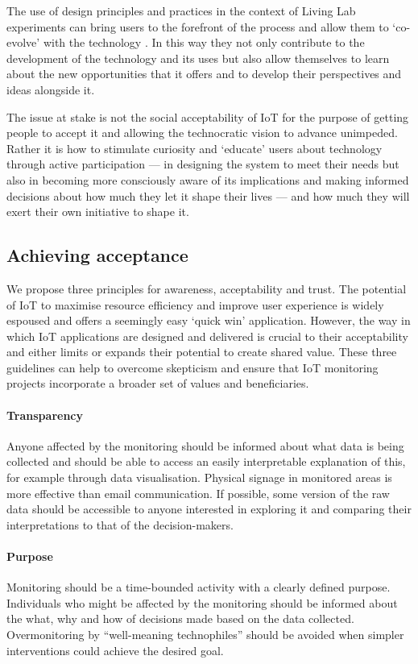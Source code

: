 The use of design principles and practices in the context of Living
Lab experiments can bring users to the forefront of the process and
allow them to ‘co-evolve’ with the technology \cite{Shin-2017-UTIO}.
In this way they not only contribute to the development of the
technology and its uses but also allow themselves to learn about the
new opportunities that it offers and to develop their perspectives and
ideas alongside it.

The issue at stake is not the social acceptability of IoT for the
purpose of getting people to accept it and allowing the technocratic
vision to advance unimpeded. Rather it is how to stimulate curiosity
and ‘educate’ users about technology through active participation ---
in designing the system to meet their needs but also in becoming more
consciously aware of its implications and making informed decisions
about how much they let it shape their lives --- and how much they
will exert their own initiative to shape it.

\subsection{Achieving acceptance}
\label{sec:achieving-acceptance}

We propose three principles for awareness, acceptability and trust. The potential of IoT to maximise
resource efficiency and improve user experience is widely espoused and
offers a seemingly easy ‘quick win’ application. However, the way in
which IoT applications are designed and delivered is crucial to their
acceptability and either limits or expands their potential to create shared value. These
three guidelines can help to overcome skepticism and ensure that IoT
monitoring projects incorporate a broader set of values and
beneficiaries. 


\paragraph{Transparency} Anyone affected by the monitoring should be
informed about what data is being collected and should be able to
access an easily interpretable explanation of this, for example
through data visualisation. Physical signage in monitored areas is
more effective than email communication. If possible, some version of
the raw data should be accessible to anyone interested in exploring it
and comparing their interpretations to that of the decision-makers. 

\paragraph{Purpose} Monitoring should be a time-bounded activity with
a clearly defined purpose. Individuals who might be affected by the
monitoring should be informed about the what, why and how of decisions
made based on the data collected. Overmonitoring by “well-meaning
technophiles” should be avoided when simpler interventions could
achieve the desired goal. 

